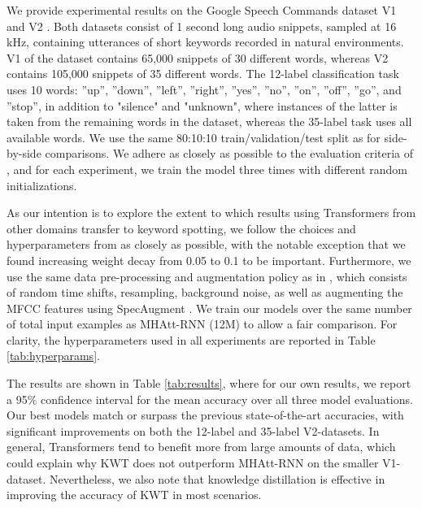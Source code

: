 \documentclass[a4paper]{article}
\begin{document}
We provide experimental results on the Google Speech Commands dataset V1 and V2 \cite{warden2018speech}. Both datasets consist of 1 second long audio snippets, sampled at 16 kHz, containing utterances of short keywords recorded in natural environments. V1 of the dataset contains 65,000 snippets of 30 different words, whereas V2 contains 105,000 snippets of 35 different words. The 12-label classification task uses 10 words:  ”up”, ”down”, ”left”, ”right”, ”yes”, ”no”, ”on”, ”off”, ”go”, and ”stop”, in addition to "silence" and "unknown", where instances of the latter is taken from the remaining words in the dataset, whereas the 35-label task uses all available words. We use the same 80:10:10 train/validation/test split as \cite{warden2018speech, zhang2017hello, rybakov2020streaming} for side-by-side comparisons. We adhere as closely as possible to the evaluation criteria of \cite{rybakov2020streaming}, and for each experiment, we train the model three times with different random initializations. 

As our intention is to explore the extent to which results using Transformers from other domains transfer to keyword spotting, we follow the choices and hyperparameters from \cite{touvron2020training} as closely as possible, with the notable exception that we found increasing weight decay from 0.05 to 0.1 to be important. Furthermore, we use the same data pre-processing and augmentation policy as in \cite{rybakov2020streaming}, which consists of random time shifts, resampling, background noise, as well as augmenting the MFCC features using SpecAugment \cite{park2019specaugment}. We train our models over the same number of total input examples as MHAtt-RNN (12M) to allow a fair comparison. For clarity, the hyperparameters used in all experiments are reported in Table \ref{tab:hyperparams}.

The results are shown in Table \ref{tab:results}, where for our own results, we report a 95\% confidence interval for the mean accuracy over all three model evaluations. Our best models match or surpass the previous state-of-the-art accuracies, with significant improvements on both the 12-label and 35-label V2-datasets. In general, Transformers tend to benefit more from large amounts of data, which could explain why KWT does not outperform MHAtt-RNN on the smaller V1-dataset. Nevertheless, we also note that knowledge distillation is effective in improving the accuracy of KWT in most scenarios.
\end{document}
